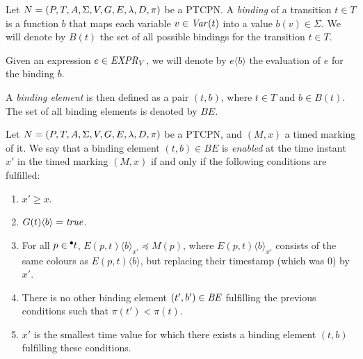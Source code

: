 \begin{definition} [(Bindings)]
Let $N=(P,T,A,\Sigma,V,G,E,\lambda,D,\pi)$ be a PTCPN.
A {\em binding} of a transition $t \in T$ is a function
$b$ that maps each variable $v \in {\it Var}(t)$
into a value $b(v) \in \Sigma$.
We will denote by $B(t)$ the set of all possible bindings
for the transition $t \in T$. 

Given an expression $e \in {\it EXPR}_V$, we will denote 
by $e\langle b \rangle$ the evaluation of $e$ for the
binding $b$.

A {\em binding element} is then defined as a pair
$(t,b)$, where $t \in T$ and $b \in B(t)$.
The set of all binding elements is denoted by $\mathit{BE}$.
\end{definition}

\begin{definition}\label{permitidas}
Let $N=(P,T,A,\Sigma,V,G,E,\lambda,D,\pi)$ be a PTCPN,
and $(M,x)$ a timed marking of it.
We say that a 
binding element $(t,b) \in \mathit{BE}$
is {\em enabled} at the time instant $x'$ in the timed marking
$(M,x)$ if and
only if the following conditions are fulfilled:

\begin{enumerate}
\item $x' \geq x$.
%
\item $G(t)\langle b \rangle = {\it true}$.
%
\item For all $p \in \hspace*{-0.4em}~^{\bullet} \hspace*{-0.05em}t$,
$E(p,t)\langle b\rangle_{x'} \preceq M(p)$, 
where 
%
$E(p,t)\langle b \rangle_{x'}$ consists of the same
colours as $E(p,t)\langle b \rangle$, but 
replacing their timestamp (which was $0$) by $x'$.
%
%
\item There is no other binding element $(t',b') \in {\it BE}$
fulfilling the previous conditions  such that $\pi(t') < \pi(t)$.
%
%
\item $x'$ is the smallest time value for which there exists
a binding element $(t,b)$ fulfilling these conditions.
%
\end{enumerate}
%
\end{definition}

